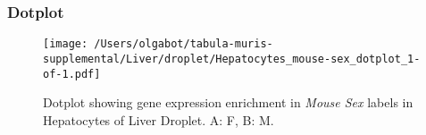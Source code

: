 \clearpage

\subsubsection{Dotplot}
\begin{figure}[h]
\centering
\texttt{[image: /Users/olgabot/tabula-muris-supplemental/Liver/droplet/Hepatocytes\_mouse-sex\_dotplot\_1-of-1.pdf]}

\caption{ Dotplot  showing gene expression enrichment in \emph{Mouse Sex} labels in Hepatocytes of Liver Droplet. A: F, B: M.}
\end{figure}

